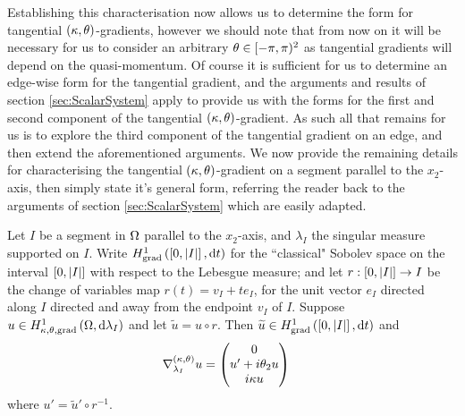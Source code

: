 Establishing this characterisation now allows us to determine the form for tangential $\left( \kappa, \theta \right)$-gradients, however we should note that from now on it will be necessary for us to consider an arbitrary $\theta\in[-\pi,\pi)^2$ as tangential gradients will depend on the quasi-momentum.
Of course it is sufficient for us to determine an edge-wise form for the tangential gradient, and the arguments and results of section \ref{sec:ScalarSystem} apply to provide us with the forms for the first and second component of the tangential $\left( \kappa, \theta \right)$-gradient.
As such all that remains for us is to explore the third component of the tangential gradient on an edge, and then extend the aforementioned arguments.
We now provide the remaining details for characterising the tangential $\left( \kappa, \theta \right)$-gradient on a segment parallel to the $x_2$-axis, then simply state it's general form, referring the reader back to the arguments of section \ref{sec:ScalarSystem} which are easily adapted.
\begin{prop} \label{prop:ktTangentialGradientSegment}
	Let $I$ be a segment in $\Omega$ parallel to the $x_2$-axis, and $\lambda_I$ the singular measure supported on $I$.
	Write $H^1_\mathrm{grad}\left( \left[ 0,\left\lvert I \right\rvert \right], \mathrm{d}t \right)$ for the ``classical" Sobolev space on the interval $\left[ 0,\left\lvert I \right\rvert \right]$ with respect to the Lebesgue measure; and let $r:\left[ 0,\left\lvert I \right\rvert \right]\rightarrow I$ be the change of variables map $r(t) = v_I + te_I$, for the unit vector $e_I$ directed along $I$ directed and away from the endpoint $v_I$ of $I$.
	Suppose $u\in H^1_{\kappa,\theta,\mathrm{grad}}\left( \Omega, \mathrm{d}\lambda_I \right)$ and let $\widetilde{u} = u\circ r$. 
	Then $\widetilde{u}\in H^1_\mathrm{grad}\left( \left[ 0,\left\lvert I \right\rvert \right], \mathrm{d}t \right)$ and 
	\begin{align*}
		\nabla^{\left( \kappa, \theta \right)}_{\lambda_I}u &= \begin{pmatrix} 0 \\ u' + i\theta_2 u \\ i\kappa u\end{pmatrix}
	\end{align*}
	where $u' = \widetilde{u}'\circ r^{-1}$.
\end{prop}
